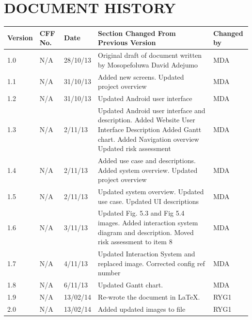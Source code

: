 \documentclass[12pt]{article}
\begin{document}
\section{DOCUMENT HISTORY}
\begin{longtable}{|p{1.5cm}|p{1.5cm}|p{2cm}|p{6cm}| p{2cm}|}
\hline
	Version & CFF No. & Date & Section Changed From Previous Version & Changed by \\
\hline
	1.0 & N/A & 28/10/13 & Original draft of document written by Mosopefoluwa David Adejumo & MDA \\ 
\hline
	1.1 & N/A & 31/10/13 & Added new screens. Updated project overview &MDA \\
\hline
	1.2 & N/A & 31/10/13 & Updated Android user interface & MDA \\
\hline 
	1.3 & N/A & 2/11/13 & Updated Android user interface and description.
Added Website User Interface Description
Added Gantt chart. Added Navigation overview
Updated risk assessment & MDA \\
\hline 
	1.4 & N/A & 2/11/13 & Added use case and descriptions. Added system overview. Updated project overview & MDA \\
\hline 
	1.5 & N/A & 2/11/13 & Updated system overview. Updated use case. Updated UI descriptions & MDA \\
\hline
	1.6 & N/A & 3/11/13 & Updated Fig. 5.3 and Fig 5.4 images. Added interaction system diagram and description.
Moved risk assessment to item 8 & MDA \\
\hline 
	1.7 & N/A & 4/11/13 & Updated Interaction System and replaced image. Corrected config ref number & MDA \\
\hline 
	1.8 & N/A & 6/11/13 & Updated Gantt chart. & MDA \\
\hline	
	1.9 & N/A & 13/02/14 & Re-wrote the document in LaTeX. & RYG1 \\
\hline
	2.0 & N/A & 13/02/14 & Added updated images to file & RYG1 \\
\hline

\end{longtable}
\end{document}
